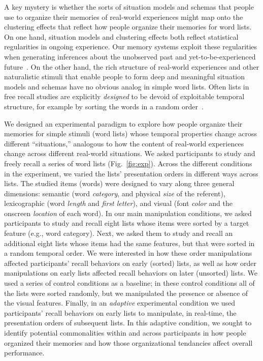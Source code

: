 \documentclass[11pt]{article}
\begin{document}
A key mystery is whether the sorts of situation models and schemas that people
use to organize their memories of real-world experiences might map onto the
clustering effects that reflect how people organize their memories for word
lists. On one hand, situation models and clustering effects both reflect
statistical regularities in ongoing experience. Our memory systems exploit
these regularities when generating inferences about the unobserved past and
yet-to-be-experienced future~\citep{XuEtal22, SchaTurk15, RangRitc12,
BoweEtal79, MomeEtal17}. On the other hand, the rich structure of real-world
experiences and other naturalistic stimuli that enable people to form deep and meaningful
situation models and schemas have no obvious analog in simple word lists.  Often lists
in free recall studies are explicitly \textit{designed} to be devoid of exploitable
temporal structure, for example by sorting the words in a random order~\citep{Kaha12}.

We designed an experimental paradigm to explore how people organize their
memories for simple stimuli (word lists) whose temporal properties change
across different ``situations,'' analogous to how the content of real-world
experiences change across different real-world situations. We asked
participants to study and freely recall a series of word lists
(Fig.~\ref{fig:exp}). Across the different conditions in the experiment, we
varied the lists' presentation orders in different ways across lists. The
studied items (words) were designed to vary along three general dimensions:
semantic (word \textit{category}, and physical \textit{size} of the referent),
lexicographic (word \textit{length} and \textit{first letter}), and visual
(font \textit{color} and the onscreen \textit{location} of each word). In our
main manipulation conditions, we asked participants to study and recall eight
lists whose items were sorted by a target feature (e.g., word category). Next,
we asked them to study and recall an additional eight lists whose items had the
same features, but that were sorted in a random temporal order. We were
interested in how these order manipulations affected participants' recall
behaviors on early (sorted) lists, as well as how order manipulations on early
lists affected recall behaviors on later (unsorted) lists. We used a series of
control conditions as a baseline; in these control conditions all of the lists
were sorted randomly, but we manipulated the presence or absence of the visual
features. Finally, in an \textit{adaptive} experimental condition we used
participants' recall behaviors on early lists to manipulate, in real-time, the
presentation orders of subsequent lists. In this adaptive condition, we sought
to identify potential commonalities within and across participants in how
people organized their memories and how those organizational tendancies affect
overall performance.
\end{document}
